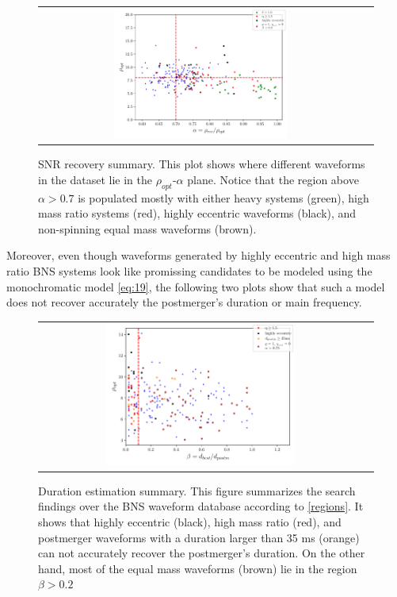 \begin{figure}[hbt!]
\begin{center}
\begin{tabular}{cc}
\includegraphics[width=0.55\textwidth, angle=0]{images/Data_analysis/results/alpha_sum0.pdf}
\end{tabular}
\captionsetup{width=0.8\textwidth}
\caption[SNR recovery summary]
{SNR recovery summary. This plot shows where different waveforms in the dataset lie in the $\rho_{opt}$-$\alpha$ plane. Notice that the region above $\alpha>0.7$ is populated mostly with either heavy systems (green), high mass ratio systems (red),  highly eccentric waveforms (black), and non-spinning equal mass waveforms (brown).}
\label{1}
\end{center}
\end{figure}
\FloatBarrier

\newpage


Moreover, even though waveforms generated by highly eccentric and high mass ratio BNS systems look like promissing candidates to be modeled using the monochromatic model \ref{eq:19}, the following two plots show that such a model does not recover accurately the postmerger's duration or main frequency.

\begin{figure}[hbt!]
\begin{center}
\begin{tabular}{cc}
\includegraphics[width=0.6\textwidth, angle=0]{images/Data_analysis/results/alpha_sum1.pdf}
\end{tabular}
\captionsetup{width=0.8\textwidth}
\caption[Duration estimation summary]
{Duration estimation summary. This figure summarizes the search findings over the BNS waveform database according to \ref{regions}. It shows that highly eccentric (black), high mass ratio (red), and postmerger waveforms with a duration larger than 35 ms (orange) can not accurately recover the postmerger's duration. On the other hand, most of the equal mass waveforms (brown) lie in the region $\beta>0.2$}
\label{2}
\end{center}
\end{figure}


